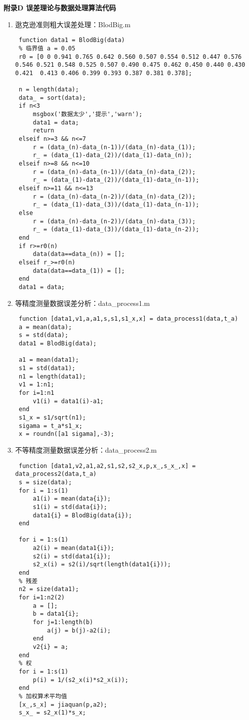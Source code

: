 \newpage
\begin{center}
	\textbf{附录D 误差理论与数据处理算法代码}
\end{center}
\begin{enumerate}
	\item 逖克逊准则粗大误差处理：BlodBig.m
	\begin{lstlisting}
 function data1 = BlodBig(data)
 % 临界值 a = 0.05
 r0 = [0 0 0.941 0.765 0.642 0.560 0.507 0.554 0.512 0.447 0.576 0.546 0.521 0.548 0.525 0.507 0.490 0.475 0.462 0.450 0.440 0.430 0.421  0.413 0.406 0.399 0.393 0.387 0.381 0.378];
 
 n = length(data);
 data_ = sort(data);
 if n<3
     msgbox('数据太少','提示','warn');
     data1 = data;
     return
 elseif n>=3 && n<=7
     r = (data_(n)-data_(n-1))/(data_(n)-data_(1));
     r_ = (data_(1)-data_(2))/(data_(1)-data_(n));
 elseif n>=8 && n<=10
     r = (data_(n)-data_(n-1))/(data_(n)-data_(2));
     r_ = (data_(1)-data_(2))/(data_(1)-data_(n-1));
 elseif n>=11 && n<=13
     r = (data_(n)-data_(n-2))/(data_(n)-data_(2));
     r_ = (data_(1)-data_(3))/(data_(1)-data_(n-1));
 else
     r = (data_(n)-data_(n-2))/(data_(n)-data_(3));
     r_ = (data_(1)-data_(3))/(data_(1)-data_(n-2));
 end
 if r>=r0(n)
     data(data==data_(n)) = [];
 elseif r_>=r0(n)
     data(data==data_(1)) = [];
 end
 data1 = data;\end{lstlisting}
	\item 等精度测量数据误差分析：data\_process1.m
	\begin{lstlisting}
 function [data1,v1,a,a1,s,s1,s1_x,x] = data_process1(data,t_a)
 a = mean(data);
 s = std(data);
 data1 = BlodBig(data);
 
 a1 = mean(data1);
 s1 = std(data1);
 n1 = length(data1);
 v1 = 1:n1;
 for i=1:n1
     v1(i) = data1(i)-a1;
 end
 s1_x = s1/sqrt(n1);
 sigama = t_a*s1_x;
 x = roundn([a1 sigama],-3);\end{lstlisting}
	\item 不等精度测量数据误差分析：data\_process2.m
	\begin{lstlisting}
 function [data1,v2,a1,a2,s1,s2,s2_x,p,x_,s_x_,x] = data_process2(data,t_a)
 s = size(data);
 for i = 1:s(1)
     a1(i) = mean(data{i});
     s1(i) = std(data{i});
     data1{i} = BlodBig(data{i});
 end
 
 for i = 1:s(1)
     a2(i) = mean(data1{i});
     s2(i) = std(data1{i});
     s2_x(i) = s2(i)/sqrt(length(data1{i}));
 end
 % 残差
 n2 = size(data1);
 for i=1:n2(2)
     a = [];
     b = data1{i};
     for j=1:length(b)
         a(j) = b(j)-a2(i);
     end
     v2{i} = a;
 end
 % 权
 for i = 1:s(1)
     p(i) = 1/(s2_x(i)*s2_x(i));
 end
 % 加权算术平均值
 [x_,s_x] = jiaquan(p,a2);
 s_x_ = s2_x(1)*s_x;
 

\end{lstlisting}
\end{enumerate}
